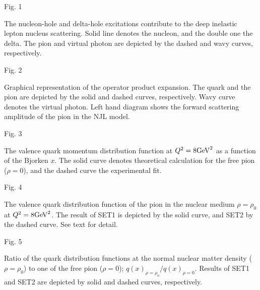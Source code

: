 \vspace{0.5cm}
\ni
Fig. 1

\ni
The nucleon-hole and delta-hole excitations contribute to the
deep inelastic lepton nucleus scattering.  Solid line denotes the
nucleon, and the double one the delta.  The pion and virtual photon are
depicted by the dashed and wavy curves, respectively.


\vspace{1cm}

\ni
Fig. 2

\ni
Graphical representation of the operator product expansion.
The quark and the pion are depicted by the solid and dashed
curves, respectively.  Wavy curve denotes the virtual photon.
Left hand
diagram shows the forward scattering amplitude of the pion in the NJL
model.

\vspace{1cm}

\ni
Fig. 3

\ni
The valence quark momentum distribution function at $Q^2 = 8
\mbox{GeV}^2$ as a function of the Bjorken $x$.
The solid curve denotes theoretical calculation for the free
pion ($\rho = 0$), and the dashed curve the experimental
fit\cite{SMRS}.

\vspace{1cm}

\ni
Fig. 4

\ni
The valence quark distribution function of the pion in the nuclear
medium $\rho=\rho_0$ at
$Q^2 = 8 \mbox{GeV}^2$.  The result of SET1 is depicted by the solid curve,
and SET2 by the dashed curve.   See text for detail.

\vspace{1cm}

\ni
Fig. 5

\ni
Ratio of the quark distribution functions at the normal nuclear matter
density ($\rho= \rho_0$)
to one of the free pion ($\rho = 0$);
$q(x)_{\rho=\rho_0} / q(x)_{\rho=0}$.
Results of SET1 and SET2 are depicted by solid and dashed curves,
respectively.


%
